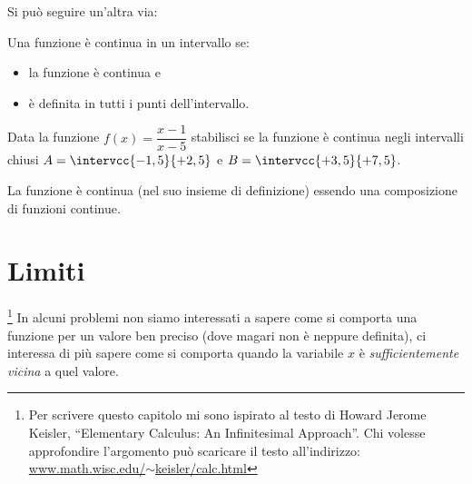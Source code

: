 Si può seguire un'altra via: 

\begin{definizione}
Una funzione è continua in un intervallo se:
\begin{itemize} [noitemsep]
\item 
la funzione è continua e %
\item 
è definita in tutti i punti dell'intervallo.
\end{itemize}
\end{definizione}

\begin{esempio}
Data la funzione \(f(x) = \dfrac{x-1}{x-5}\) stabilisci se la funzione è 
continua negli intervalli chiusi \(A=\intervcc{-1,5}{+2,5}\) e 
\(B=\intervcc{+3,5}{+7,5}\).

La funzione è continua (nel suo insieme di definizione) essendo una 
composizione di funzioni continue.

\end{esempio}


\section{Limiti}
\label{sec:cont_limiti}

\footnote{Per scrivere questo capitolo mi sono ispirato 
al testo di Howard Jerome Keisler, 
``Elementary Calculus: An Infinitesimal Approach''. 
Chi volesse approfondire l'argomento può scaricare il testo all'indirizzo: 
\href{https://www.math.wisc.edu/~keisler/calc.html}
     {www.math.wisc.edu/\(\sim\)keisler/calc.html}}
In alcuni problemi non siamo interessati a sapere come si comporta una 
funzione per un valore ben preciso (dove magari non è neppure definita), ci 
interessa di più sapere come si comporta quando la variabile \(x\) è 
\emph{sufficientemente vicina} a quel valore.

